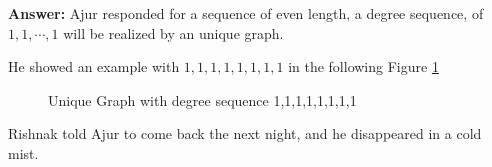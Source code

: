 \textbf{Answer:} Ajur responded for a sequence of even length, a degree sequence, of $1,1,\cdots, 1$ will be realized by an unique graph.

He showed an example with $1,1,1,1,1,1,1,1$ in the following Figure \ref{daya1}

\begin{figure}
\begin{center}
\caption{ Unique Graph with degree sequence 1,1,1,1,1,1,1,1 }\label{daya1}
\end{center}
\end{figure}

Rishnak told Ajur to come back the next night, and he disappeared in a cold mist.